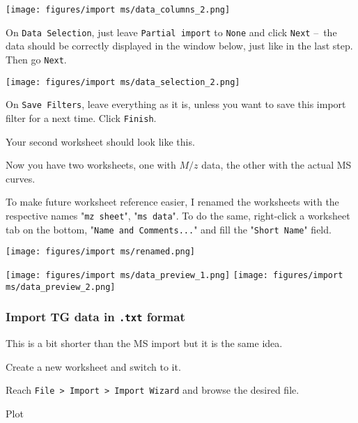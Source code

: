 \documentclass[a4paper, 11pt, raggedright, parskip]{tufte-style-article}
\begin{document}
\begin{ol}
\texttt{[image: figures/import ms/data\_columns\_2.png]}

\item On \texttt{Data Selection}, just leave \texttt{Partial import} to \texttt{None} and click \texttt{Next} --~the data should be correctly displayed in the window below, just like in the last step. Then go \texttt{Next}.

\texttt{[image: figures/import ms/data\_selection\_2.png]}

\item On \texttt{Save Filters}, leave everything as it is, unless you want to save this import filter for a next time. Click \texttt{Finish}.

\end{ol}

Your second worksheet should look like this.

Now you have two worksheets, one with $M/z$ data, the other with the actual MS curves.

To make future worksheet reference easier, I renamed the worksheets with the respective names "\texttt{mz sheet}", "\texttt{ms data}". To do the same, right-click a worksheet tab on the bottom, "\texttt{Name and Comments...}" and fill the "\texttt{Short Name}" field.

\texttt{[image: figures/import ms/renamed.png]}

\smallskip

\begin{wide}
\texttt{[image: figures/import ms/data\_preview\_1.png]}
\hfill
\texttt{[image: figures/import ms/data\_preview\_2.png]}
\end{wide}

\subsubsection{Import TG data in \texttt{.txt} format}
\label{subsubsec:import_tg}

This is a bit shorter than the MS import but it is the same idea.

\begin{ol}

\item Create a new worksheet and switch to it.

\item Reach \texttt{File > Import > Import Wizard} and browse the desired file.

\item Plot 

\end{ol}	
\end{document}
